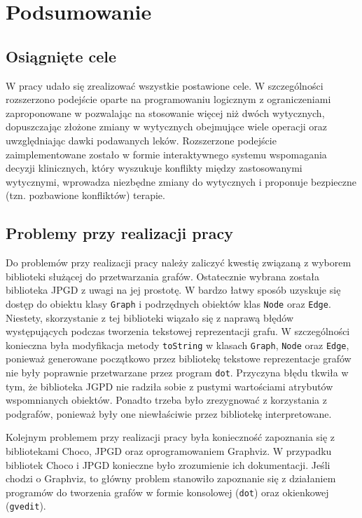 \chapter{Podsumowanie}

\section{Osiągnięte cele}
W pracy udało się zrealizować wszystkie postawione cele. W szczególności rozszerzono podejście oparte na programowaniu logicznym z ograniczeniami zaproponowane w \cite{SzWilk2} pozwalając na stosowanie więcej niż dwóch wytycznych, dopuszczając złożone zmiany w wytycznych obejmujące wiele operacji oraz uwzględniając dawki podawanych leków. Rozszerzone podejście zaimplementowane zostało w formie interaktywnego systemu wspomagania decyzji klinicznych, który wyszukuje konflikty między zastosowanymi wytycznymi, wprowadza niezbędne zmiany do wytycznych i proponuje bezpieczne (tzn. pozbawione konfliktów) terapie.

\section{Problemy przy realizacji pracy}
Do problemów przy realizacji pracy należy zaliczyć kwestię związaną z wyborem biblioteki służącej do przetwarzania grafów. Ostatecznie wybrana została biblioteka JPGD z uwagi na jej prostotę. W bardzo łatwy sposób uzyskuje się dostęp do obiektu klasy \texttt{Graph} i podrzędnych obiektów klas \texttt{Node} oraz \texttt{Edge}. Niestety, skorzystanie z tej biblioteki wiązało się z naprawą błędów występujących podczas tworzenia tekstowej reprezentacji grafu. W szczególności konieczna była modyfikacja metody \texttt{toString} w klasach \texttt{Graph}, \texttt{Node} oraz \texttt{Edge}, ponieważ generowane początkowo przez bibliotekę tekstowe reprezentacje grafów nie były poprawnie przetwarzane przez program \texttt{dot}. Przyczyna błędu tkwiła w tym, że biblioteka JGPD nie radziła sobie z pustymi wartościami atrybutów wspomnianych obiektów. Ponadto trzeba było zrezygnować z korzystania z podgrafów, ponieważ były one niewłaściwie przez bibliotekę interpretowane. 

Kolejnym problemem przy realizacji pracy była konieczność zapoznania się z bibliotekami Choco, JPGD oraz oprogramowaniem Graphviz. W przypadku bibliotek Choco i JPGD konieczne było zrozumienie ich dokumentacji. Jeśli chodzi o Graphviz, to główny problem stanowiło zapoznanie się z działaniem programów do tworzenia grafów w formie konsolowej (\texttt{dot}) oraz okienkowej (\texttt{gvedit}).

